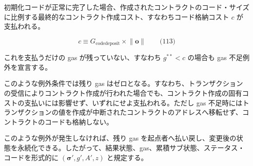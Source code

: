 \documentclass[
]{ltjsarticle}
\begin{document}
初期化コードが正常に完了した場合、作成されたコントラクトのコード・サイズに比例する最終的なコントラクト作成コスト、すなわちコード格納コスト
\(c\) が支払われる。

\protect\hypertarget{eq-113}{}{}

\[c \equiv G_{\mathrm{codedeposit}} \times \lVert \mathbf{o} \rVert \qquad \text{(113)}\]

これを支払うだけの gas が残っていない、すなわち \(g^{**} < c\) の場合も
gas 不足例外を宣言する。

このような例外条件では残り gas
はゼロとなる。すなわち、トランザクションの受信によりコントラクト作成が行われた場合でも、コントラクト作成の固有コストの支払いには影響せず、いずれにせよ支払われる。ただし
gas
不足時にはトランザクションの値を作成が中断されたコントラクトのアドレスへ移転せず、コントラクトのコードも格納しない。

このような例外が発生しなければ、残り gas
を起点者へ払い戻し、変更後の状態を永続化できる。したがって、結果状態、gas、累積サブ状態、ステータス・コードを形式的に
\((\boldsymbol{\sigma}', g', A', z)\) と規定する。

\protect\hypertarget{eq-114}{}{}\protect\hypertarget{eq-115}{}{}\protect\hypertarget{eq-116}{}{}\protect\hypertarget{eq-117}{}{}\protect\hypertarget{eq-118}{}{}
\end{document}
